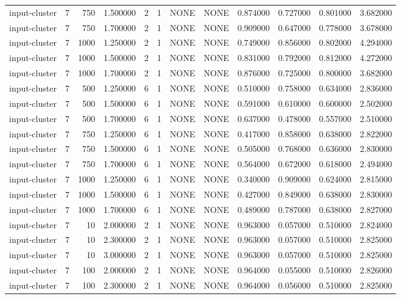\begin{tabular}{lrrrllllrrrr}
input-cluster & 7 & 750 & 1.500000 & 2 & 1 & NONE & NONE & 0.874000 & 0.727000 & 0.801000 & 3.682000 \\
input-cluster & 7 & 750 & 1.700000 & 2 & 1 & NONE & NONE & 0.909000 & 0.647000 & 0.778000 & 3.678000 \\
input-cluster & 7 & 1000 & 1.250000 & 2 & 1 & NONE & NONE & 0.749000 & 0.856000 & 0.802000 & 4.294000 \\
input-cluster & 7 & 1000 & 1.500000 & 2 & 1 & NONE & NONE & 0.831000 & 0.792000 & 0.812000 & 4.272000 \\
input-cluster & 7 & 1000 & 1.700000 & 2 & 1 & NONE & NONE & 0.876000 & 0.725000 & 0.800000 & 3.682000 \\
input-cluster & 7 & 500 & 1.250000 & 6 & 1 & NONE & NONE & 0.510000 & 0.758000 & 0.634000 & 2.836000 \\
input-cluster & 7 & 500 & 1.500000 & 6 & 1 & NONE & NONE & 0.591000 & 0.610000 & 0.600000 & 2.502000 \\
input-cluster & 7 & 500 & 1.700000 & 6 & 1 & NONE & NONE & 0.637000 & 0.478000 & 0.557000 & 2.510000 \\
input-cluster & 7 & 750 & 1.250000 & 6 & 1 & NONE & NONE & 0.417000 & 0.858000 & 0.638000 & 2.822000 \\
input-cluster & 7 & 750 & 1.500000 & 6 & 1 & NONE & NONE & 0.505000 & 0.768000 & 0.636000 & 2.830000 \\
input-cluster & 7 & 750 & 1.700000 & 6 & 1 & NONE & NONE & 0.564000 & 0.672000 & 0.618000 & 2.494000 \\
input-cluster & 7 & 1000 & 1.250000 & 6 & 1 & NONE & NONE & 0.340000 & 0.909000 & 0.624000 & 2.815000 \\
input-cluster & 7 & 1000 & 1.500000 & 6 & 1 & NONE & NONE & 0.427000 & 0.849000 & 0.638000 & 2.830000 \\
input-cluster & 7 & 1000 & 1.700000 & 6 & 1 & NONE & NONE & 0.489000 & 0.787000 & 0.638000 & 2.827000 \\
input-cluster & 7 & 10 & 2.000000 & 2 & 1 & NONE & NONE & 0.963000 & 0.057000 & 0.510000 & 2.824000 \\
input-cluster & 7 & 10 & 2.300000 & 2 & 1 & NONE & NONE & 0.963000 & 0.057000 & 0.510000 & 2.825000 \\
input-cluster & 7 & 10 & 3.000000 & 2 & 1 & NONE & NONE & 0.963000 & 0.057000 & 0.510000 & 2.825000 \\
input-cluster & 7 & 100 & 2.000000 & 2 & 1 & NONE & NONE & 0.964000 & 0.055000 & 0.510000 & 2.826000 \\
input-cluster & 7 & 100 & 2.300000 & 2 & 1 & NONE & NONE & 0.964000 & 0.056000 & 0.510000 & 2.825000 \\

\end{tabular}
